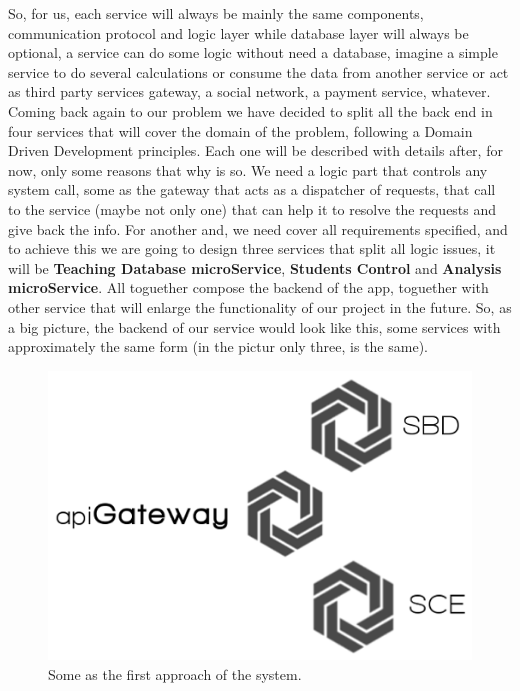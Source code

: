 \noindent So, for us, each service will always be mainly the same components,
communication protocol and logic layer while database layer will always be optional,
a service can do some logic without need a database, imagine a simple service
to do several calculations or consume the data from another service or act as
third party services gateway, a social network, a payment service, whatever.
\intro
Coming back again to our problem we have decided to split all the back end in
four services that will cover the domain of the problem, following a Domain
Driven Development principles. Each one will be described with details after,
for now, only some reasons that why is so. We need a logic part that controls
any system call, some as the gateway that acts as a dispatcher of requests, that
call to the service (maybe not only one) that can help it to resolve the requests
and give back the info.
\intro
For another and, we need cover all requirements specified,
and to achieve this we are going to design three services that split all logic
issues, it will be \textbf{Teaching Database microService}, \textbf{Students Control}
and \textbf{Analysis microService}. All toguether compose the backend of the app,
toguether with other service that will enlarge the functionality of our project
in the future.
\intro
So, as a big picture, the backend of our service would look like this, some
services with approximately the same form (in the pictur only three, is the same).

\begin{figure}[H]
  \includegraphics[scale=0.25]{img/graphics/backend.png}
  \centering
  \caption{Some as the first approach of the system.}
\end{figure}

